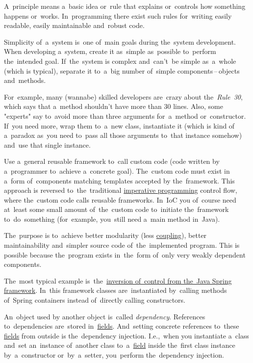A~principle means a~basic idea or~rule that explains or~controls how something happens or~works. In~programming there exist such rules for~writing easily readable, easily maintainable and~robust code.

Simplicity of~a~system is~one of~main goals during the~system development. When developing a~system, create it as~simple as~possible to~perform the~intended goal. If~the~system is complex and~can't~be simple as~a~whole (which is typical), separate it to~a~big number of~simple components\,--\,objects and~methods.

For~example, many (wannabe) skilled developers are~crazy about the~\textit{Rule~30}, which says that a~method shouldn't have more than 30 lines. Also, some "experts" say to~avoid more than three arguments for~a~method or~constructor. If~you need more, wrap them to~a~new class, instantiate it (which is kind of a~paradox as~you need to~pass all those arguments to~that instance somehow) and~use that single instance.

\label{inversionofcontrol}
Use a~general reusable framework to~call custom code (code written by a~programmer to~achieve a~concrete goal). The~custom code must exist in a~form of~components matching templates accepted by the~framework. This approach is reversed to~the~traditional \hyperref[imperativeprogramming]{imperative programming} control flow, where the~custom code calls reusable frameworks. In~IoC you of~course need at~least some small amount of~the~custom code to~initiate the~framework to~do~something (for~example, you~still need a~main method in~Java).

The~purpose is to~achieve better modularity (less \hyperref[loosetightcoupling]{coupling}), better maintainability and~simpler source code of~the~implemented program. This is possible because the~program exists in~the~form of~only very weakly dependent components.

The~most typical example is~the~\hyperref[springinversionofcontrol]{inversion of~control from the~Java Spring framework}. In~this framework classes are~instantiated by~calling methods of~Spring containers instead of~directly calling constructors.

\label{dependencyinjection}
An~object used by another object is~called \textit{dependency}. References to~dependencies are~stored in~\hyperref[variablefieldproperty]{fields}. And~setting concrete references to~these \hyperref[variablefieldproperty]{fields} from outside is the~dependency injection. I.e.,~when you instantiate a~class and~set an~instance of~another class to~a~\hyperref[variablefieldproperty]{field} inside the~first class instance by~a~constructor or~by~a~setter, you~perform the~dependency injection.

